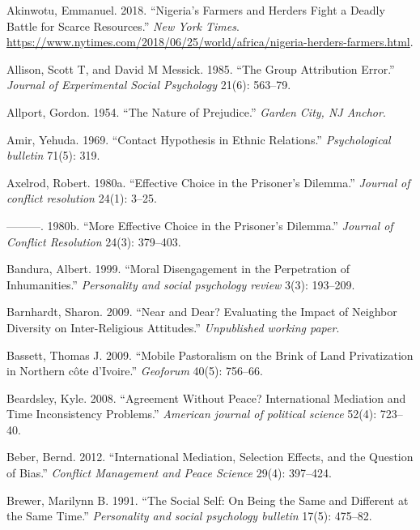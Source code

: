 \documentclass[11pt]{article}
\begin{document}
\hypertarget{refs}{}
\leavevmode\hypertarget{ref-nyt2018nigeria}{}%
Akinwotu, Emmanuel. 2018. ``Nigeria's Farmers and Herders Fight a Deadly
Battle for Scarce Resources.'' \emph{New York Times}.
\url{https://www.nytimes.com/2018/06/25/world/africa/nigeria-herders-farmers.html}.

\leavevmode\hypertarget{ref-allison1985group}{}%
Allison, Scott T, and David M Messick. 1985. ``The Group Attribution
Error.'' \emph{Journal of Experimental Social Psychology} 21(6):
563--79.

\leavevmode\hypertarget{ref-allport1954prejudice}{}%
Allport, Gordon. 1954. ``The Nature of Prejudice.'' \emph{Garden City,
NJ Anchor}.

\leavevmode\hypertarget{ref-amir1969contact}{}%
Amir, Yehuda. 1969. ``Contact Hypothesis in Ethnic Relations.''
\emph{Psychological bulletin} 71(5): 319.

\leavevmode\hypertarget{ref-axelrod1980effective}{}%
Axelrod, Robert. 1980a. ``Effective Choice in the Prisoner's Dilemma.''
\emph{Journal of conflict resolution} 24(1): 3--25.

\leavevmode\hypertarget{ref-axelrod1980more}{}%
---------. 1980b. ``More Effective Choice in the Prisoner's Dilemma.''
\emph{Journal of Conflict Resolution} 24(3): 379--403.

\leavevmode\hypertarget{ref-bandura1999moral}{}%
Bandura, Albert. 1999. ``Moral Disengagement in the Perpetration of
Inhumanities.'' \emph{Personality and social psychology review} 3(3):
193--209.

\leavevmode\hypertarget{ref-barnhardt2009near}{}%
Barnhardt, Sharon. 2009. ``Near and Dear? Evaluating the Impact of
Neighbor Diversity on Inter-Religious Attitudes.'' \emph{Unpublished
working paper}.

\leavevmode\hypertarget{ref-bassett2009mobile}{}%
Bassett, Thomas J. 2009. ``Mobile Pastoralism on the Brink of Land
Privatization in Northern côte d'Ivoire.'' \emph{Geoforum} 40(5):
756--66.

\leavevmode\hypertarget{ref-beardsley2008agreement}{}%
Beardsley, Kyle. 2008. ``Agreement Without Peace? International
Mediation and Time Inconsistency Problems.'' \emph{American journal of
political science} 52(4): 723--40.

\leavevmode\hypertarget{ref-beber2012international}{}%
Beber, Bernd. 2012. ``International Mediation, Selection Effects, and
the Question of Bias.'' \emph{Conflict Management and Peace Science}
29(4): 397--424.

\leavevmode\hypertarget{ref-brewer1991social}{}%
Brewer, Marilynn B. 1991. ``The Social Self: On Being the Same and
Different at the Same Time.'' \emph{Personality and social psychology
bulletin} 17(5): 475--82.
\end{document}
